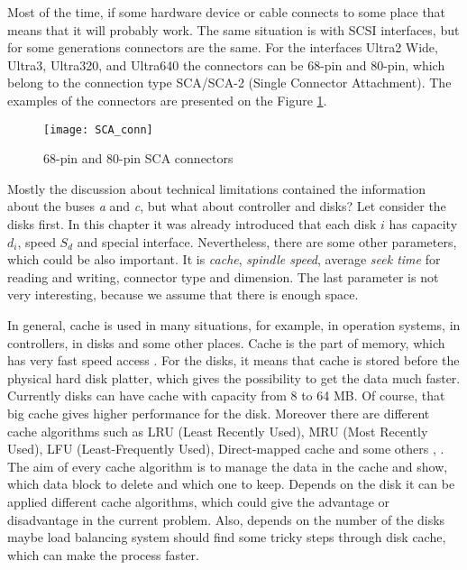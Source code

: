 Most of the time, if some hardware device or cable connects to some place that means that it will probably work. The same situation is with SCSI interfaces, but for some generations connectors are the same. For the interfaces Ultra2 Wide, Ultra3, Ultra320, and Ultra640 the connectors can be 68-pin and 80-pin, which belong to the connection type SCA/SCA-2 (Single Connector Attachment). The examples of the connectors are presented on the Figure \ref{fig:SCA_conn}.
\begin{figure}[h]
\begin{center}
	\label{fig:SCA_conn}
  \texttt{[image: SCA\_conn]}
\end{center}
  \caption{68-pin and 80-pin SCA connectors}
  \label{fig:SCA_conn}
\end{figure}


Mostly the discussion about technical limitations contained the information about the buses \emph{a} and \emph{c}, but what about controller and disks? Let consider the disks first. In this chapter it was already introduced that each disk $i$ has capacity $d_i$, speed $S_d$ and special interface. Nevertheless, there are some other parameters, which could be also important. It is \emph{cache}, \emph{spindle speed}, average \emph{seek time} for reading and writing, connector type and dimension. The last parameter is not very interesting, because we assume that there is enough space.

In general, cache is used in many situations, for example, in operation systems, in controllers, in disks and some other places. Cache is the part of memory, which has very fast speed access \cite{intro_scsi_perform}. For the disks, it means that cache is stored before the physical hard disk platter, which gives the possibility to get the data much faster. Currently disks can have cache with capacity from 8 to 64 MB. Of course, that big cache gives higher performance for the disk. Moreover there are different cache algorithms such as LRU (Least Recently Used), MRU (Most Recently Used), LFU (Least-Frequently Used), Direct-mapped cache and some others \cite{cache_alg}, \cite{cache_strategies}. The aim of every cache algorithm is to manage the data in the cache and show, which data block to delete and which one to keep. Depends on the disk it can be applied different cache algorithms, which could give the advantage or disadvantage in the current problem. Also, depends on the number of the disks maybe load balancing system should find some tricky steps through disk cache, which can make the process faster.


